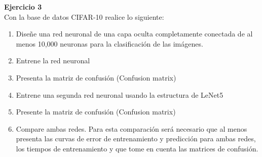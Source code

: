 \documentclass[a4paper, 11pt]{article}
\newenvironment{problem}[2][Ejercicio]
{ \begin{mdframed}[backgroundcolor= red!50] \textbf{#1 #2} \\}
	{  \end{mdframed}}
\begin{document}
\begin{problem}{3} 
    Con la base de datos CIFAR-10 realice lo siguiente:
    \begin{enumerate}
        \item Diseñe una red neuronal de una capa oculta completamente conectada de al menos 10,000 neuronas para la clasificación de las imágenes.
        \item Entrene la red neuronal 
        \item Presenta la matriz de confusión (Confusion matrix)
        \item Entrene una segunda red neuronal usando la estructura de LeNet5 
        \item Presente la matriz de confusión (Confusion matrix)
        \item Compare ambas redes. Para esta comparación será necesario que al menos presenta las curvas de error de entrenamiento y predicción para ambas redes, los tiempos de entrenamiento y que tome en cuenta las matrices de confusión.
    \end{enumerate}
\end{problem}
\end{document}
